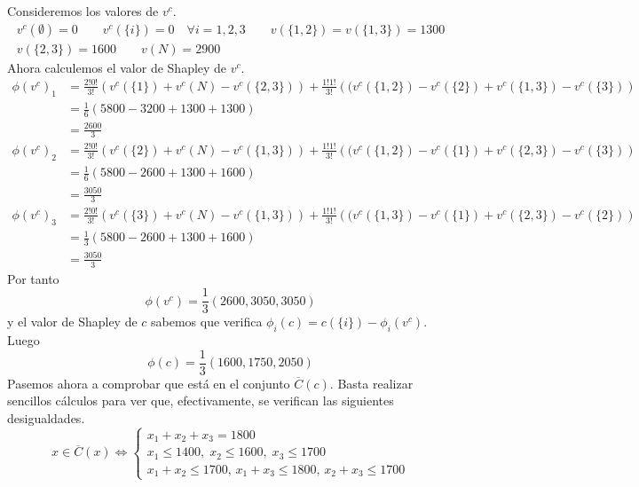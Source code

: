 \documentclass[twoside]{article}
\begin{document}
\begin{solucion}
Consideremos  los valores de $v^c$.
\begin{gather*}
v^c(\emptyset) = 0 \qquad v^c(\{i\}) = 0 \quad \forall i = 1,2,3 \qquad  v(\{1,2\}) = v(\{1,3\}) = 1300\\
v(\{2,3\}) = 1600 \qquad v(N)=2900
\end{gather*}
Ahora calculemos el valor de Shapley de $v^c$. 
\begin{align*}
\phi(v^c)_1& = \frac{2!0!}{3!}(v^c(\{1\})+ v^c(N) -v^c(\{2,3\})) + \frac{1!1!}{3!}\left((v^c(\{1,2\})-v^c(\{2\}) + v^c(\{1,3\})-v^c(\{3\}) \right)\\
&= \frac{1}{6}(5800-3200 + 1300 + 1300)\\& = \frac{2600}{3}\\
\phi(v^c)_2& = \frac{2!0!}{3!}(v^c(\{2\})+ v^c(N) -v^c(\{1,3\})) + \frac{1!1!}{3!}\left((v^c(\{1,2\})-v^c(\{1\}) + v^c(\{2,3\})-v^c(\{3\}) \right)\\
&= \frac{1}{6}(5800-2600 + 1300 + 1600)\\& = \frac{3050}{3}\\
\phi(v^c)_3& = \frac{2!0!}{3!}(v^c(\{3\})+ v^c(N) -v^c(\{1,3\})) + \frac{1!1!}{3!}\left((v^c(\{1,3\})-v^c(\{1\}) + v^c(\{2,3\})-v^c(\{2\}) \right)\\
&= \frac{1}{3}(5800-2600 + 1300 + 1600)\\& = \frac{3050}{3}
\end{align*}
Por tanto
$$
\phi(v^c) = \frac{1}{3}(2600,3050,3050)
$$
y el valor de Shapley de $c$ sabemos que verifica $\phi_i(c) = c(\{i\}) - \phi_i(v^c)$. Luego 
$$
\phi(c)= \frac{1}{3}(1600,1750,2050)
$$
Pasemos ahora a comprobar que está en el conjunto $\overline{C}(c)$.  Basta realizar sencillos cálculos para ver que, efectivamente, se verifican las siguientes desigualdades.
$$
x\in \overline{C}(x) \Leftrightarrow \begin{cases}
x_1+x_2+x_3 = 1800\\
x_1\leq 1400, \; x_2 \leq 1600, \; x_3 \leq 1700\\
x_1+x_2 \leq 1700,\, x_1+x_3 \leq 1800,\, x_2+x_3 \leq 1700
\end{cases}
$$
\end{solucion}
\newpage
\end{document}
